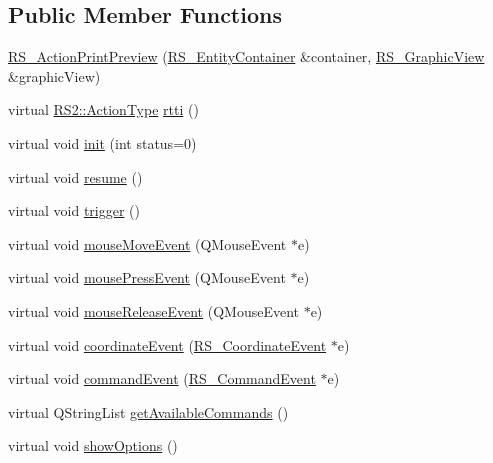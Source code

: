 \subsection*{Public Member Functions}
\begin{DoxyCompactItemize}
\item 
\hyperlink{classRS__ActionPrintPreview_a52b029f0485dff1326319836d3c1cb53}{R\-S\-\_\-\-Action\-Print\-Preview} (\hyperlink{classRS__EntityContainer}{R\-S\-\_\-\-Entity\-Container} \&container, \hyperlink{classRS__GraphicView}{R\-S\-\_\-\-Graphic\-View} \&graphic\-View)
\item 
virtual \hyperlink{classRS2_afe3523e0bc41fd637b892321cfc4b9d7}{R\-S2\-::\-Action\-Type} \hyperlink{classRS__ActionPrintPreview_a4b245a3484aa8bbdd01c09dd3be80341}{rtti} ()
\item 
virtual void \hyperlink{classRS__ActionPrintPreview_abe8c6f4f33a6f706a05968786a115843}{init} (int status=0)
\item 
virtual void \hyperlink{classRS__ActionPrintPreview_ae628c6a81a3d2929bbf736790fb1ecb4}{resume} ()
\item 
virtual void \hyperlink{classRS__ActionPrintPreview_a08768c6e711603321e648e0d7a65eba6}{trigger} ()
\item 
virtual void \hyperlink{classRS__ActionPrintPreview_a2249ffee63fb31491f638371274f401e}{mouse\-Move\-Event} (Q\-Mouse\-Event $\ast$e)
\item 
virtual void \hyperlink{classRS__ActionPrintPreview_a2a4cc3c6017ebc2d277bed2a3a827136}{mouse\-Press\-Event} (Q\-Mouse\-Event $\ast$e)
\item 
virtual void \hyperlink{classRS__ActionPrintPreview_a0db50d8342c3caab0d5afbcd114aa962}{mouse\-Release\-Event} (Q\-Mouse\-Event $\ast$e)
\item 
virtual void \hyperlink{classRS__ActionPrintPreview_a9ee2a78b4beb1ea39fd2a03771960334}{coordinate\-Event} (\hyperlink{classRS__CoordinateEvent}{R\-S\-\_\-\-Coordinate\-Event} $\ast$e)
\item 
virtual void \hyperlink{classRS__ActionPrintPreview_aa305e8ce23823b6b14561505bd166b10}{command\-Event} (\hyperlink{classRS__CommandEvent}{R\-S\-\_\-\-Command\-Event} $\ast$e)
\item 
virtual Q\-String\-List \hyperlink{classRS__ActionPrintPreview_a171a0d089fdb81a8c923307789c8c7b4}{get\-Available\-Commands} ()
\item 
virtual void \hyperlink{classRS__ActionPrintPreview_a38327a232b06c134e042f977758d8779}{show\-Options} ()
\item 

\end{DoxyCompactItemize}
